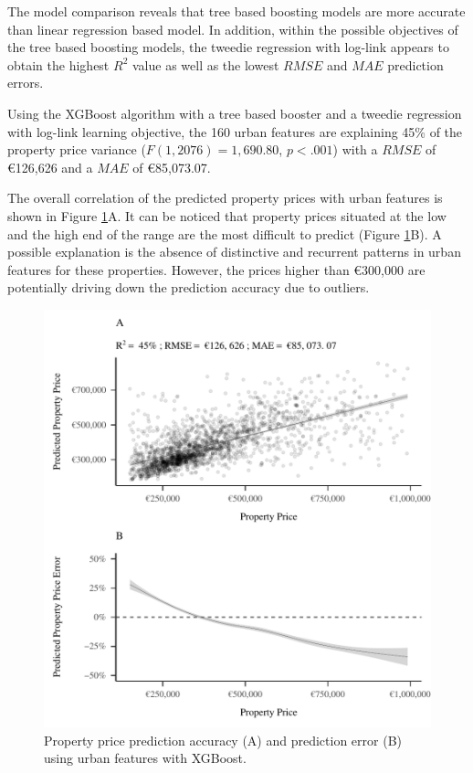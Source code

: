 \documentclass[conference,final,]{IEEEtran}
\begin{document}
The model comparison reveals that tree based boosting models are more accurate than linear regression based model. In addition, within the possible objectives of the tree based boosting models, the tweedie regression with log-link appears to obtain the highest \(R^2\) value as well as the lowest \(RMSE\) and \(MAE\) prediction errors.

Using the XGBoost algorithm with a tree based booster and a tweedie regression with log-link learning objective, the 160 urban features are explaining 45\% of the property price variance (\(F(1, 2076) = 1,690.80\), \(p < .001\)) with a \(RMSE\) of €126,626 and a \(MAE\) of €85,073.07.

The overall correlation of the predicted property prices with urban features is shown in Figure \ref{fig:osm-features-xgb}A. It can be noticed that property prices situated at the low and the high end of the range are the most difficult to predict (Figure \ref{fig:osm-features-xgb}B). A possible explanation is the absence of distinctive and recurrent patterns in urban features for these properties. However, the prices higher than €300,000 are potentially driving down the prediction accuracy due to outliers.

\begin{figure}[!h]
\includegraphics[width=0.98\columnwidth]{manuscript_files/figure-latex/osm-features-xgb-1} \caption{Property price prediction accuracy (A) and prediction error (B) using urban features with XGBoost.}\label{fig:osm-features-xgb}
\end{figure}
\end{document}
